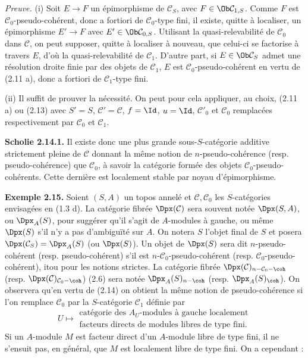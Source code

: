 \documentclass[11pt]{article}
\begin{document}
\emph{Preuve.} (i) Soit \(E\to F\) un épimorphisme de \(\mathcal C_S\), avec \(F\in\Ob\mathcal C_{1,S}\). Comme \(F\) est \(\mathcal C_0\)-pseudo-cohérent, donc a fortiori de \(\mathcal C_0\)-type fini, il existe, quitte à localiser, un épimorphisme \(E'\to F\) avec \(E'\in\Ob\mathcal C_{0,S}\). Utilisant la quasi-relevabilité de \(\mathcal C_0\) dans \(\mathcal C\), on peut supposer, quitte à localiser à nouveau, que celui-ci se factorise à travers \(E\), d'où la quasi-relevabilité de \(\mathcal C_1\). D'autre part, si \(E\in\Ob\mathcal C_S\) admet une résolution droite finie par des objets de \(\mathcal C_1\), \(E\) est \(\mathcal C_0\)-pseudo-cohérent en vertu de (2.11 a), donc a fortiori de \(\mathcal C_1\)-type fini.

(ii) Il suffit de prouver la nécessité. On peut pour cela appliquer, au choix, (2.11 a) ou (2.13) avec \(S'=S\), \(\mathcal C'=\mathcal C\), \(f=\Id\), \(u=\Id\), \(\mathcal C'_0\) et \(\mathcal C_0\) remplacées respectivement par \(\mathcal C_0\) et \(\mathcal C_1\).

\textbf{Scholie 2.14.1.} Il existe donc une plus grande sous-\(S\)-catégorie additive strictement pleine de \(\mathcal C\) donnant la même notion de \(n\)-pseudo-cohérence (resp. pseudo-cohérence) que \(\mathcal C_0\), à savoir la catégorie formée des objets \(\mathcal C_0\)-pseudo-cohérents. Cette dernière est localement stable par noyau d'épimorphisme.

\textbf{Exemple 2.15.} Soient \((S,A)\) un topos annelé et \(\mathcal C,\mathcal C_0\) les \(S\)-catégories envisagées en (1.3 d). La catégorie fibrée \(\Dpx(\mathcal C)\) sera souvent notée \(\Dpx(S,A)\), ou \(\Dpx_A(S)\), pour suggérer qu'il s'agit de \(A\)-modules à gauche, ou même \(\Dpx(S)\) s'il n'y a pas d'ambiguïté sur \(A\). On notera \(S\) l'objet final de \(S\) et posera \(\Dpx(\mathcal C_S)=\Dpx_A(S)\) (ou \(\Dpx(S)\)). Un objet de \(\Dpx(S)\) sera dit \(n\)-pseudo-cohérent (resp. pseudo-cohérent) s'il est \(n\)-\(\mathcal C_0\)-pseudo-cohérent (resp. \(\mathcal C_0\)-pseudo-cohérent), itou pour les notions strictes. La catégorie fibrée \(\Dpx(\mathcal C)_{n-\mathcal C_0-\coh}\) (resp. \(\Dpx(\mathcal C)_{\mathcal C_0-\coh}\)) (2.6) sera notée \(\Dpx_A(S)_{n-\coh}\) (resp. \(\Dpx_A(S)_{\coh}\)). On observera qu'en vertu de (2.14) on obtient la même notion de pseudo-cohérence si l'on remplace \(\mathcal C_0\) par la \(S\)-catégorie \(\mathcal C_1\) définie par
\[
  U\longmapsto
  \begin{gathered}
  \text{catégorie des }A_U\text{-modules à gauche localement}\\
  \text{facteurs directs de modules libres de type fini}.
  \end{gathered}
\]
Si un \(A\)-module \(M\) est facteur direct d'un \(A\)-module libre de type fini, il ne s'ensuit pas, en général, que \(M\) est localement libre de type fini. On a cependant :
\end{document}
